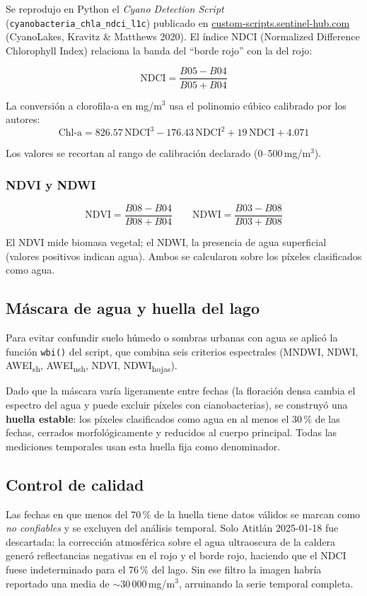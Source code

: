 \documentclass[12pt, a4paper]{article}
\newcommand{\mgm}{\,mg/m$^3$}
\begin{document}
Se reprodujo en Python el \emph{Cyano Detection Script} (\texttt{cyanobacteria\_chla\_ndci\_l1c})
publicado en \href{https://custom-scripts.sentinel-hub.com}{custom-scripts.sentinel-hub.com}
(CyanoLakes, Kravitz \& Matthews 2020). El índice NDCI (Normalized Difference Chlorophyll Index)
relaciona la banda del ``borde rojo'' con la del rojo:

\[
  \text{NDCI} = \frac{B05 - B04}{B05 + B04}
\]

La conversión a clorofila-a en mg/m$^3$ usa el polinomio cúbico calibrado por los autores:
\[
  \text{Chl-a} = 826.57\,\text{NDCI}^3 - 176.43\,\text{NDCI}^2 + 19\,\text{NDCI} + 4.071
\]

Los valores se recortan al rango de calibración declarado (0--500\mgm).

\subsubsection{NDVI y NDWI}

\[
  \text{NDVI} = \frac{B08 - B04}{B08 + B04} \qquad
  \text{NDWI} = \frac{B03 - B08}{B03 + B08}
\]

El NDVI mide biomasa vegetal; el NDWI, la presencia de agua superficial (valores positivos
indican agua). Ambos se calcularon sobre los píxeles clasificados como agua.

\subsection{Máscara de agua y huella del lago}

Para evitar confundir suelo húmedo o sombras urbanas con agua se aplicó la función
\texttt{wbi()} del script, que combina seis criterios espectrales (MNDWI, NDWI, AWEI\textsubscript{sh},
AWEI\textsubscript{nsh}, NDVI, NDWI\textsubscript{hojas}).

Dado que la máscara varía ligeramente entre fechas (la floración densa cambia el espectro del
agua y puede excluir píxeles con cianobacterias), se construyó una \textbf{huella estable}:
los píxeles clasificados como agua en al menos el 30\,\% de las fechas, cerrados morfológicamente
y reducidos al cuerpo principal. Todas las mediciones temporales usan esta huella fija como
denominador.

\subsection{Control de calidad}

Las fechas en que menos del 70\,\% de la huella tiene datos válidos se marcan como
\emph{no confiables} y se excluyen del análisis temporal. Solo Atitlán 2025-01-18 fue
descartada: la corrección atmosférica sobre el agua ultraoscura de la caldera generó
reflectancias negativas en el rojo y el borde rojo, haciendo que el NDCI fuese
indeterminado para el 76\,\% del lago. Sin ese filtro la imagen habría reportado una
media de $\sim$30\,000\mgm, arruinando la serie temporal completa.
\end{document}
